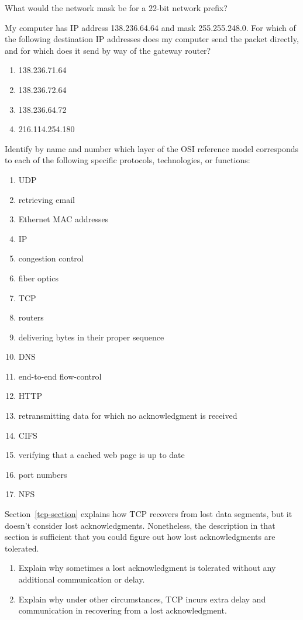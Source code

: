 \begin{chapterEnumerate}
\item
What would the network mask be for a 22-bit network prefix?
\item
My computer has IP address 138.236.64.64 and mask 255.255.248.0.  For
which of the following destination IP addresses does my computer send the packet
directly, and for which does it send by way of the gateway router?
\begin{enumerate}
\item
138.236.71.64
\item
138.236.72.64
\item
138.236.64.72
\item
216.114.254.180
\end{enumerate}
\item
Identify by name and number which layer of the OSI reference model corresponds to each
of the following specific protocols, technologies, or functions:
\begin{enumerate}
\item UDP
\item retrieving email
\item Ethernet MAC addresses
\item IP
\item congestion control
\item fiber optics
\item TCP
\item routers
\item delivering bytes in their proper sequence
\item DNS
\item end-to-end flow-control
\item HTTP
\item retransmitting data for which no acknowledgment is received
\item CIFS
\item verifying that a cached web page is up to date
\item port numbers
\item NFS
\end{enumerate}

\item
Section~\ref{tcp-section} explains how TCP recovers from lost data segments, but it doesn't consider lost acknowledgments.  Nonetheless, the description in that section is sufficient that you could figure out how lost acknowledgments are tolerated.
\begin{enumerate}
\item
Explain why sometimes a lost acknowledgment is tolerated without any additional communication or delay.
\item
Explain why under other circumstances, TCP incurs extra delay and communication in recovering from a lost acknowledgment.
\end{enumerate}

\end{chapterEnumerate}

